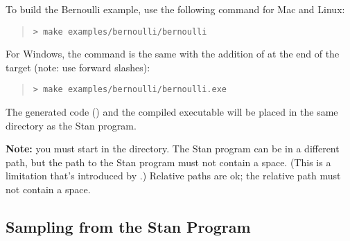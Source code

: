 To build the Bernoulli example, use the following command for Mac and
Linux:
%
\begin{quote}
\begin{Verbatim}[fontshape=sl]
> make examples/bernoulli/bernoulli
\end{Verbatim}
\end{quote}
%
For Windows, the command is the same with the addition of 
at the end of the target (note: use forward slashes):
\begin{quote}
\begin{Verbatim}[fontshape=sl]
> make examples/bernoulli/bernoulli.exe
\end{Verbatim}
\end{quote}

The generated \Cpp code () and the compiled
executable will be placed in the same directory as the Stan program.

\textbf{Note:} you must start in the 
directory. The Stan program can be in a different path, but the path
to the Stan program must not contain a space. (This is a limitation
that's introduced by .) Relative paths are ok; the relative
path must not contain a space.

\subsection{Sampling from the Stan Program}


